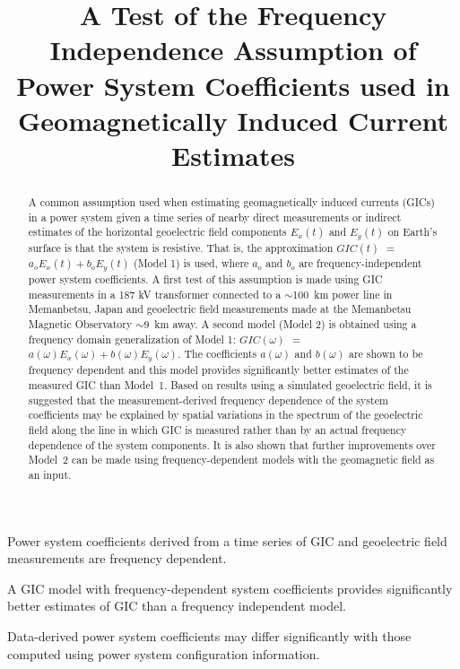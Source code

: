 \documentclass[draft,linenumbers]{agujournal2018}
\begin{document}
\title{A Test of the Frequency Independence Assumption of Power System Coefficients used in Geomagnetically Induced Current Estimates}





\begin{keypoints}
\item Power system coefficients derived from a time series of GIC and geoelectric field measurements are frequency dependent.
\item A GIC model with frequency-dependent system coefficients provides significantly better estimates of GIC than a frequency independent model.
\item Data-derived power system coefficients may differ significantly with those computed using power system configuration information.
\end{keypoints}

\begin{abstract}
  A common assumption used when estimating geomagnetically induced currents (GICs) in a power system given a time series of nearby direct measurements or indirect estimates of the horizontal geoelectric field components $E_x(t)$ and $E_y(t)$ on Earth's surface is that the system is resistive. That is, the approximation $GIC(t)$  $=$ $a_oE_x(t) + b_oE_y(t)$ (Model 1) is used, where $a_o$ and $b_o$ are frequency-independent power system coefficients.  A first test of this assumption is made using GIC measurements in a 187 kV transformer connected to a $\sim$100~km power line in Memanbetsu, Japan and geoelectric field measurements made at the Memanbetsu Magnetic Observatory $\sim$9~km away. A second model (Model 2) is obtained using a frequency domain generalization of Model 1: $GIC(\omega)$ $=$ $a(\omega)E_x(\omega) + b(\omega)E_y(\omega)$. The coefficients $a(\omega)$ and $b(\omega)$ are shown to be frequency dependent and this model provides significantly better estimates of the measured GIC than Model~1. Based on results using a simulated geoelectric field, it is suggested that the measurement-derived frequency dependence of the system coefficients may be explained by spatial variations in the spectrum of the geoelectric field along the line in which GIC is measured rather than by an actual frequency dependence of the system components. It is also shown that further improvements over Model~2 can be made using frequency-dependent models with the geomagnetic field as an input.
\end{abstract}
\end{document}
